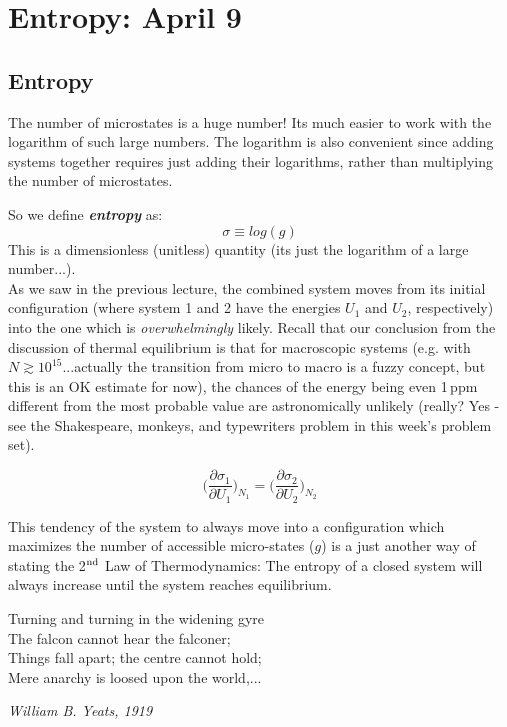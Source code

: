 \section{Entropy: April 9}

\subsection{Entropy}
\label{s:Entropy}
The number of microstates is a huge number! Its much easier to work with the
logarithm of such large numbers. The logarithm is also convenient since adding
systems together requires just adding their logarithms, rather than multiplying
the number of microstates.

So we define \textit{\textbf{entropy}} as:
\begin{equation}
\sigma \equiv log(g)
\end{equation}
This is a dimensionless (unitless) quantity (its just the logarithm 
of a large number...). \\

As we saw in the previous lecture, the combined system moves from its initial configuration
(where system 1 and 2 have the energies $U_1$ and $U_2$, respectively) into the one which
is \emph{overwhelmingly} likely. Recall that our conclusion from the discussion of thermal
equilibrium is that for macroscopic systems (e.g. with $N \gtrsim 10^{15}$...actually the
transition from micro to macro is a fuzzy concept, but this is an OK estimate for now), the
chances of the energy being even 1\,ppm different from the most probable value are astronomically unlikely (really? Yes - see the Shakespeare, monkeys, and typewriters
problem in this week's problem set).

\begin{equation}
\bigg(\frac{\partial \sigma_1}{\partial U_1}\bigg)_{N_1} = 
\bigg(\frac{\partial \sigma_2}{\partial U_2}\bigg)_{N_2}
\label{eq:Teq}
\end{equation}

This tendency of the system to always move into a configuration which maximizes
the number of accessible micro-states ($g$) is a just another way of stating the
2$^{\rm nd}$ Law of Thermodynamics: The entropy of a closed system will always 
increase until the system reaches equilibrium.

\epigraph{Turning and turning in the widening gyre \\
The falcon cannot hear the falconer; \\
Things fall apart; the centre cannot hold; \\
Mere anarchy is loosed upon the world,...}{\textit{William B. Yeats, 1919}}

